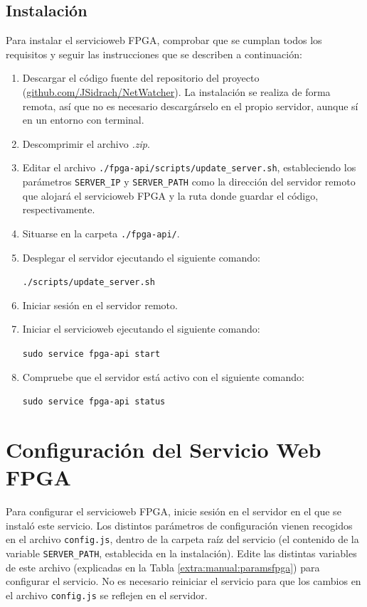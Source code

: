 \subsection*{Instalación}
Para instalar el \gls{servicioweb} \gls{FPGA}, comprobar que se cumplan todos los requisitos y seguir las instrucciones que se describen a continuación:
\begin{enumerate}
  \item Descargar el código fuente del repositorio del proyecto (\href{https://github.com/JSidrach/NetWatcher/archive/master.zip}{\footnotesize{github.com/JSidrach/NetWatcher}}). La instalación se realiza de forma remota, así que no es necesario descargárselo en el propio servidor, aunque sí en un entorno con terminal.
  \item Descomprimir el archivo \textit{.zip}.
  \item Editar el archivo \texttt{./fpga-api/scripts/update\_server.sh}, estableciendo los parámetros \texttt{SERVER\_IP} y \texttt{SERVER\_PATH} como la dirección del servidor remoto que alojará el \gls{servicioweb} \gls{FPGA} y la ruta donde guardar el código, respectivamente.
  \item Situarse en la carpeta \texttt{./fpga-api/}.
  \item Desplegar el servidor ejecutando el siguiente comando:
  
  \texttt{./scripts/update\_server.sh}
  \item Iniciar sesión en el servidor remoto.
  \item Iniciar el \gls{servicioweb} ejecutando el siguiente comando:

  \texttt{sudo service fpga-api start}
  \item Compruebe que el servidor está activo con el siguiente comando:

  \texttt{sudo service fpga-api status}
\end{enumerate}


\section{Configuración del Servicio Web FPGA\label{extra:manual:configfpga}}
Para configurar el \gls{servicioweb} \gls{FPGA}, inicie sesión en el servidor en el que se instaló este servicio. Los distintos parámetros de configuración vienen recogidos en el archivo \texttt{config.js}, dentro de la carpeta raíz del servicio (el contenido de la variable \texttt{SERVER\_PATH}, establecida en la instalación). Edite las distintas variables de este archivo (explicadas en la Tabla \ref{extra:manual:paramsfpga}) para configurar el servicio. No es necesario reiniciar el servicio para que los cambios en el archivo \texttt{config.js} se reflejen en el servidor.

